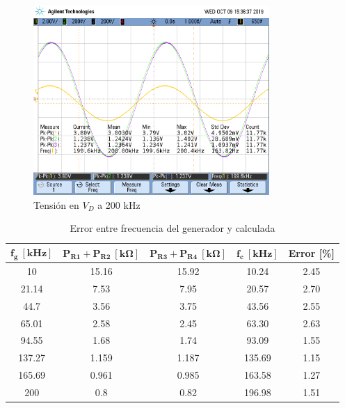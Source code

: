 \begin{figure}[H]
\centering
\includegraphics[width=0.8\textwidth,trim={0.25cm 5cm  1 5cm},clip]{Mediciones/Tensiones_200_KHz}
\caption{Tensión en $V_D$ a 200 kHz}
\label{fig:Tensiones_200_KHz}
\end{figure}

\begin{table}[H]
\centering
\begin{tabular}{ccccc}
\hline
$\mathbf{f_g \ [kHz]}$ & $\mathbf{P_{R1} + P_{R2} \ [k\Omega]}$ & $\mathbf{P_{R3} + P_{R4} \ [k\Omega]}$ & $\mathbf{f_c \ [kHz]}$ & \textbf{Error [\%]} \\
\hline
10                     & 15.16                                  & 15.92                                  & 10.24                  & 2.45                \\
21.14                  & 7.53                                   & 7.95                                   & 20.57                  & 2.70                \\
44.7                   & 3.56                                   & 3.75                                   & 43.56                  & 2.55                \\
65.01                  & 2.58                                   & 2.45                                   & 63.30                  & 2.63                \\
94.55                  & 1.68                                   & 1.74                                   & 93.09                  & 1.55                \\
137.27                 & 1.159                                  & 1.187                                  & 135.69                 & 1.15                \\
165.69                 & 0.961                                  & 0.985                                  & 163.58                 & 1.27                \\
200                    & 0.8                                    & 0.82                                   & 196.98                 & 1.51   				\\
\hline            
\end{tabular}
\caption{Error entre frecuencia del generador y calculada}
\label{tab:Tabla_error}
\end{table}

